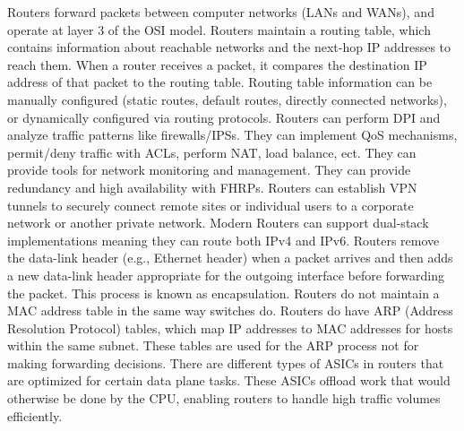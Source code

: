 \documentclass{article}
\begin{document}
	Routers forward packets between computer networks (LANs and WANs), and operate at layer 3 of the OSI model. Routers maintain a routing table, which contains information about reachable networks and the next-hop IP addresses to reach them. When a router receives a packet, it compares the destination IP address of that packet to the routing table. Routing table information can be manually configured (static routes, default routes, directly connected networks), or dynamically configured via routing protocols. Routers can perform DPI and analyze traffic patterns like firewalls/IPSs. They can implement QoS mechanisms, permit/deny traffic with ACLs, perform NAT, load balance, ect. They can provide tools for network monitoring and management. They can provide redundancy and high availability with FHRPs. Routers can establish VPN tunnels to securely connect remote sites or individual users to a corporate network or another private network. Modern Routers can support dual-stack implementations meaning they can route both IPv4 and IPv6. Routers remove the data-link header (e.g., Ethernet header) when a packet arrives and then adds a new data-link header appropriate for the outgoing interface before forwarding the packet. This process is known as encapsulation. Routers do not maintain a MAC address table in the same way switches do. Routers do have ARP (Address Resolution Protocol) tables, which map IP addresses to MAC addresses for hosts within the same subnet. These tables are used for the ARP process not for making forwarding decisions. There are different types of ASICs in routers that are optimized for certain data plane tasks. These ASICs offload work that would otherwise be done by the CPU, enabling routers to handle high traffic volumes efficiently.
\end{document}

